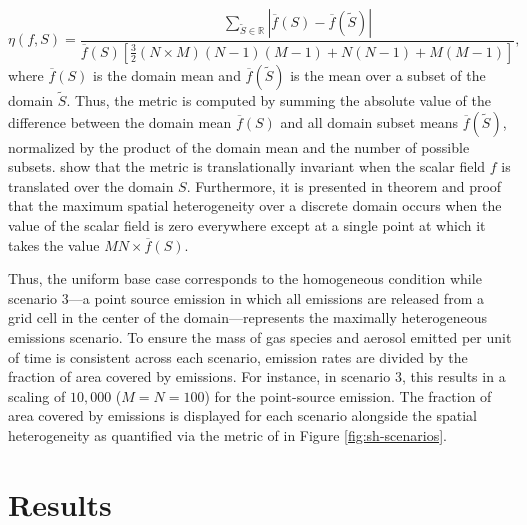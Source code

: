 \documentclass[journal abbreviation, manuscript]{copernicus}
\begin{document}
\begin{equation}
\eta(f, S) = \frac{\sum_{\tilde{S}\in \mathbb{R}}|\overline{f}(S) - \overline{f}(\tilde{S})|}{\overline{f}(S)\left[\frac{3}{2}(N\times M)(N-1)(M-1) + N(N-1) + M(M-1)\right]}, 
\end{equation}
where $\overline{f}(S)$ is the domain mean and $\overline{f}(\tilde{S})$ is the mean over a subset of the domain $\tilde{S}$. Thus, the metric is computed by summing the absolute value of the difference between the domain mean $\overline{f}(S)$ and all domain subset means $\overline{f}(\tilde{S})$, normalized by the product of the domain mean and the number of possible subsets. \citet{mohebalhojeh_2024} show that the metric is translationally invariant when the scalar field $f$ is translated over the domain $S$. Furthermore, it is presented in theorem and proof that the maximum spatial heterogeneity over a discrete domain occurs when the value of the scalar field is zero everywhere except at a single point at which it takes the value $MN\times\overline{f}(S)$.

Thus, the uniform base case corresponds to the homogeneous condition while scenario 3---a point source emission in which all emissions are released from a grid cell in the center of the domain---represents the maximally heterogeneous emissions scenario. To ensure the mass of gas species and aerosol emitted per unit of time is consistent across each scenario, emission rates are divided by the fraction of area covered by emissions. For instance, in scenario 3, this results in a scaling of $10,000$ ($M=N=100$) for the point-source emission. The fraction of area covered by emissions is displayed for each scenario alongside the spatial heterogeneity as quantified via the metric of \citet{mohebalhojeh_2024} in Figure \ref{fig:sh-scenarios}.

\section{Results}
\end{document}
